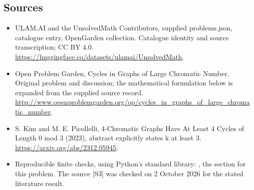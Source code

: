 \documentclass[11pt,a4paper]{article}
\begin{document}
\subsection{Sources}
\begin{itemize}
\item[S1] ULAM.AI and the UnsolvedMath Contributors, supplied problems.json, catalogue entry, OpenGarden collection. Catalogue identity and source transcription; CC BY 4.0.
\url{https://huggingface.co/datasets/ulamai/UnsolvedMath}.
\item[S2] Open Problem Garden, Cycles in Graphs of Large Chromatic Number. Original problem and discussion; the mathematical formulation below is expanded from the supplied source record.
\url{http://www.openproblemgarden.org/op/cycles_in_graphs_of_large_chromatic_number}.
\item[S3] S. Kim and M. E. Picollelli, 4-Chromatic Graphs Have At Least 4 Cycles of Length 0 mod 3 (2023), abstract explicitly states k at least 3.
\url{https://arxiv.org/abs/2312.05945}.

\item[R1] Reproducible finite checks, using Python's standard library:
, the section for this problem.
The source [S3] was checked on 2 October 2026 for the stated literature result.

\end{itemize}
\end{document}
